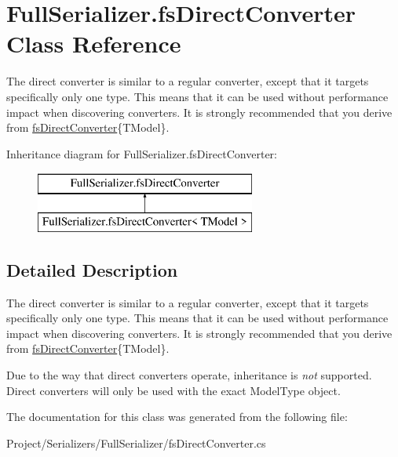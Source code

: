 \hypertarget{class_full_serializer_1_1fs_direct_converter}{}\section{Full\+Serializer.\+fs\+Direct\+Converter Class Reference}
\label{class_full_serializer_1_1fs_direct_converter}


The direct converter is similar to a regular converter, except that it targets specifically only one type. This means that it can be used without performance impact when discovering converters. It is strongly recommended that you derive from \hyperlink{class_full_serializer_1_1fs_direct_converter}{fs\+Direct\+Converter}\{T\+Model\}.  


Inheritance diagram for Full\+Serializer.\+fs\+Direct\+Converter\+:\begin{figure}[H]
\begin{center}
\leavevmode
\includegraphics[height=2.000000cm]{class_full_serializer_1_1fs_direct_converter}
\end{center}
\end{figure}


\subsection{Detailed Description}
The direct converter is similar to a regular converter, except that it targets specifically only one type. This means that it can be used without performance impact when discovering converters. It is strongly recommended that you derive from \hyperlink{class_full_serializer_1_1fs_direct_converter}{fs\+Direct\+Converter}\{T\+Model\}. 

Due to the way that direct converters operate, inheritance is {\itshape not} supported. Direct converters will only be used with the exact Model\+Type object.

The documentation for this class was generated from the following file\+:\begin{DoxyCompactItemize}
\item 
Project/\+Serializers/\+Full\+Serializer/fs\+Direct\+Converter.\+cs\end{DoxyCompactItemize}
